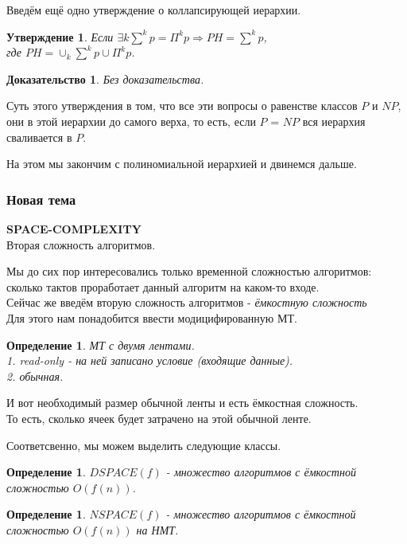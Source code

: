 \documentclass{beamer}
\theoremstyle{plain}
\newtheorem{state}[thm]{Утверждение}
\newtheorem{proof-rus}[thm]{Доказательство}
\newtheorem{dfn}[thm]{Определение}
\theoremstyle{definition}
\begin{document}
\begin{frame}
    Введём ещё одно утверждение о коллапсирующей иерархии.
    \begin{state}
        Если $\exists k \sum^kp = \Pi^kp \Rightarrow PH = \sum^kp$, \\
        где $PH = \cup_k\sum^kp\cup \Pi^kp$.
    \end{state}
    \begin{proof-rus}
        Без доказательства.
    \end{proof-rus}
    Суть этого утверждения в том, что все эти вопросы о равенстве классов
    $P$ и $NP$, они в этой иерархии до самого верха, то есть, если $P$ = $NP$
    вся иерархия сваливается в $P$. \\
\end{frame}

\begin{frame}
    \begin{center}
        На этом мы закончим с полиномиальной иерархией и двинемся дальше.
    \end{center}
\end{frame}

\begin{frame}
    \frametitle{Новая тема}
    \begin{center}
        \textbf{SPACE-COMPLEXITY} \\
        Вторая сложность алгоритмов.
    \end{center}
\end{frame}

\begin{frame}
    Мы до сих пор интересовались только временной сложностью алгоритмов: сколько тактов проработает данный алгоритм на каком-то входе. \\
    Сейчас же введём вторую сложность алгоритмов - \textit{ёмкостную сложность} \\
    Для этого нам понадобится ввести модицифированную МТ.
    \begin{dfn}
        МТ с двумя лентами. \\
        1. read-only - на ней записано условие (входящие данные). \\
        2. обычная.
    \end{dfn}
    И вот необходимый размер обычной ленты и есть ёмкостная сложность. \\
    То есть, сколько ячеек будет затрачено на этой обычной ленте.
\end{frame}

\begin{frame}
    Соответсвенно, мы можем выделить следующие классы.
    \begin{dfn}
        $DSPACE(f)$ - множество алгоритмов с ёмкостной сложностью $O(f(n))$.
    \end{dfn}
    \begin{dfn}
        $NSPACE(f)$ - множество алгоритмов с ёмкостной сложностью $O(f(n))$ на
        НМТ.
    \end{dfn}
\end{frame}
\end{document}
